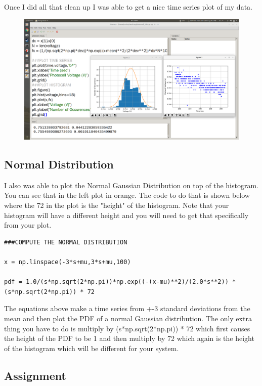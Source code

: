 Once I did all that clean up I was able to get a nice time series plot of my data. 
\begin{figure}[H]
  \begin{center}
    \includegraphics[width=\textwidth]{Figures/histogram_good.png}
  \end{center}
\end{figure}
\subsection{Normal Distribution}
I also was able to plot the Normal Gaussian Distribution on top of the histogram. You can see that in the left plot in orange. The code to do that is shown below where the 72 in the plot is the "height" of the histogram. Note that your histogram will have a different height and you will need to get that specifically from your plot. 
\begin{verbatim}
###COMPUTE THE NORMAL DISTRIBUTION 

x = np.linspace(-3*s+mu,3*s+mu,100) 

pdf = 1.0/(s*np.sqrt(2*np.pi))*np.exp((-(x-mu)**2)/(2.0*s**2)) * (s*np.sqrt(2*np.pi)) * 72
\end{verbatim}
The equations above make a time series from +-3 standard deviations from the mean and then plot the PDF of a normal Gaussian distribution. The only extra thing you have to do is multiply by (s*np.sqrt(2*np.pi)) * 72 which first causes the height of the PDF to be 1 and then multiply by 72 which again is the height of the histogram which will be different for your system.

\subsection{Assignment}

